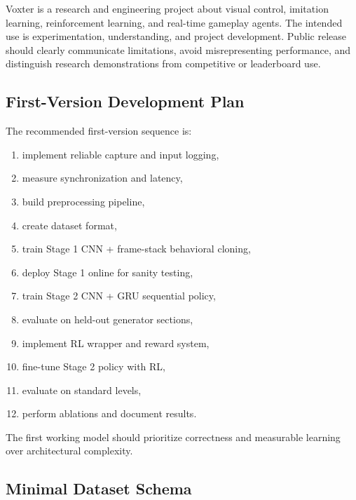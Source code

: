 \documentclass[11pt]{article}
\begin{document}
Voxter is a research and engineering project about visual control, imitation learning, reinforcement learning, and real-time gameplay agents. The intended use is experimentation, understanding, and project development. Public release should clearly communicate limitations, avoid misrepresenting performance, and distinguish research demonstrations from competitive or leaderboard use.

\subsection{First-Version Development Plan}

The recommended first-version sequence is:
\begin{enumerate}
  \item implement reliable capture and input logging,
  \item measure synchronization and latency,
  \item build preprocessing pipeline,
  \item create dataset format,
  \item train Stage 1 CNN + frame-stack behavioral cloning,
  \item deploy Stage 1 online for sanity testing,
  \item train Stage 2 CNN + GRU sequential policy,
  \item evaluate on held-out generator sections,
  \item implement RL wrapper and reward system,
  \item fine-tune Stage 2 policy with RL,
  \item evaluate on standard levels,
  \item perform ablations and document results.
\end{enumerate}

The first working model should prioritize correctness and measurable learning over architectural complexity.

\subsection{Minimal Dataset Schema}
\end{document}
